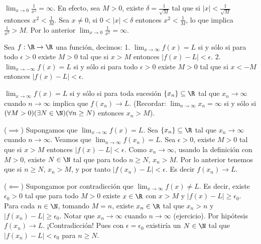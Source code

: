 \begin{example} %
$\lim_{x \to 0} \frac{1}{x^2} = \infty$. %
En efecto, sea $M > 0$, existe $\delta = \frac{1}{\sqrt{M}}$ tal que si $|x| < \frac{1}{\sqrt{M}}$ entonces $x^2 < \frac{1}{M}$. %
Sea $x \neq 0$, si $0 < |x| < \delta$ entonces $x^2 < \frac{1}{M}$, lo que implica $\frac{1}{x^2} > M$. %
Por lo anterior $\lim_{x \to 0} \frac{1}{x^2} = \infty$. %
\end{example}

\begin{definicion} %
Sea $f: \R \to \R$ una función, decimos: %
1. $\lim_{x \to \infty} f(x) = L$ si y sólo si para todo $\epsilon > 0$ existe $M > 0$ tal que si $x > M$ entonces $|f(x) - L| < \epsilon$. %
2. $\lim_{x \to -\infty} f(x) = L$ si y sólo si para todo $\epsilon > 0$ existe $M > 0$ tal que si $x < -M$ entonces $|f(x) - L| < \epsilon$. %
\end{definicion}

\begin{teorema} %
$\lim_{x \to \infty} f(x) = L$ si y sólo si para toda sucesión $\{x_n\} \subseteq \R$ tal que $x_n \to \infty$ cuando $n \to \infty$ implica que $f(x_n) \to L$. %
(Recordar: $\lim_{n \to \infty} x_n = \infty$ si y sólo si $(\forall M > 0)(\exists N \in \N)(\forall n \ge N)$ entonces $x_n > M$). %
\end{teorema}

\begin{dem} %
($\implies$) Supongamos que $\lim_{x \to \infty} f(x) = L$. %
Sea $\{x_n\} \subseteq \R$ tal que $x_n \to \infty$ cuando $n \to \infty$. Veamos que $\lim_{n \to \infty} f(x_n) = L$. %
Sea $\epsilon > 0$, existe $M > 0$ tal que si $x > M$ entonces $|f(x) - L| < \epsilon$. %
Como $x_n \to \infty$, usando la definición con $M > 0$, existe $N \in \N$ tal que para todo $n \ge N$, $x_n > M$. %
Por lo anterior tenemos que si $n \ge N$, $x_n > M$, y por tanto $|f(x_n) - L| < \epsilon$. Es decir $f(x_n) \to L$. %

($\impliedby$) Supongamos por contradicción que $\lim_{x \to \infty} f(x) \neq L$. %
Es decir, existe $\epsilon_0 > 0$ tal que para todo $M > 0$ existe $x \in \R$ con $x > M$ y $|f(x) - L| \ge \epsilon_0$. %
Para cada $n \in \N$, tomando $M = n$, existe $x_n \in \R$ tal que $x_n > n$ y $|f(x_n) - L| \ge \epsilon_0$. %
Notar que $x_n \to \infty$ cuando $n \to \infty$ (ejercicio). %
Por hipótesis $f(x_n) \to L$. ¡Contradicción! %
Pues con $\epsilon = \epsilon_0$ existiría un $N \in \N$ tal que $|f(x_n) - L| < \epsilon_0$ para $n \ge N$. %
\end{dem}

